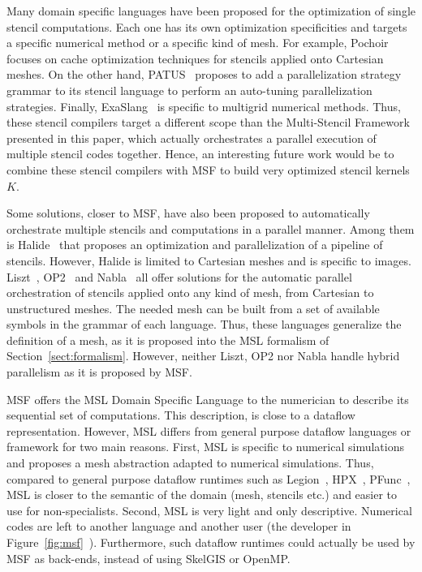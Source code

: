 Many domain specific languages have been proposed for the optimization of single stencil computations.
Each one has its own optimization specificities and targets a specific numerical method or a specific kind of mesh.
For example, Pochoir~\cite{spaaTangCKLL11} focuses on cache optimization techniques for stencils applied onto Cartesian meshes.
On the other hand, PATUS~\cite{citeulike12258902} proposes to add a parallelization strategy grammar to its stencil language to perform an auto-tuning parallelization strategies. Finally, ExaSlang~\cite{Schmitt:2014:EDL:2691166.2691171} is specific to multigrid numerical methods. Thus, these stencil compilers target a different scope than the Multi-Stencil Framework presented in this paper, which actually orchestrates a parallel execution of multiple stencil codes together. Hence, an interesting future work would be to combine these stencil compilers with MSF to build very optimized stencil kernels $K$.

Some solutions, closer to MSF, have also been proposed to automatically orchestrate multiple stencils and computations in a parallel manner. Among them is Halide~\cite{Ragan-Kelley:2013:HLC:2491956.2462176} that proposes an optimization and parallelization of a pipeline of stencils. However, Halide is limited to Cartesian meshes and is specific to images. Liszt~\cite{DeVito:2011:LDS:2063384.2063396}, OP2~\cite{} and Nabla~\cite{Camier:2015:IPP:2820083.2820107} all offer solutions for the automatic parallel orchestration of stencils applied onto any kind of mesh, from Cartesian to unstructured meshes. The needed mesh can be built from a set of available symbols in the grammar of each language. Thus, these languages generalize the definition of a mesh, as it is proposed into the MSL formalism of Section~\ref{sect:formalism}. However, neither Liszt, OP2 nor Nabla handle hybrid parallelism as it is proposed by MSF.

MSF offers the MSL Domain Specific Language to the numerician to describe its sequential set of computations. This description, is close to a dataflow representation. However, MSL differs from general purpose dataflow languages or framework for two main reasons. First, MSL is specific to numerical simulations and proposes a mesh abstraction adapted to numerical simulations. Thus, compared to general purpose dataflow runtimes such as Legion~\cite{bauer:legion:sc:2012}, HPX~\cite{}, PFunc~\cite{}, MSL is closer to the semantic of the domain (mesh, stencils etc.) and easier to use for non-specialists. Second, MSL is very light and only descriptive. Numerical codes are left to another language and another user (the developer in Figure~\ref{fig:msf}~). Furthermore, such dataflow runtimes could actually be used by MSF as back-ends, instead of using SkelGIS or OpenMP.

